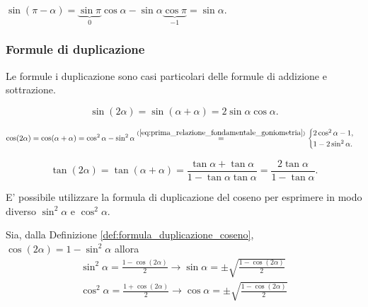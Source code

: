 \begin{example}
    $\sin(\pi-\alpha)=\underbrace{\sin\pi}_{0}\cos\alpha-\sin\alpha\underbrace{\cos\pi}_{-1}=\sin\alpha$.
\end{example}


\subsubsection{Formule di duplicazione}
Le formule i duplicazione sono casi particolari delle formule di addizione e sottrazione.

\begin{definition}
    \begin{equation}\label{eq:formula_duplicazione_seno}
        \sin(2\alpha)=\sin(\alpha+\alpha)=2\sin\alpha\cos\alpha.
    \end{equation}
\end{definition}

\begin{definition}\label{def:formula_duplicazione_coseno}
    \begin{equation}\label{eq:formula_duplciazione_coseno}
        \cos(2\alpha)=\cos(\alpha+\alpha)=\cos^2\alpha-\sin^2\alpha\overset{(\ref{eq:prima_relazione_fondamentale_goniometria})}{=}
        \begin{cases}
            2\cos^2\alpha-1,\\
            1-2\sin^2\alpha.
        \end{cases}
    \end{equation}
\end{definition}

\begin{definition}
    \begin{equation*}
        \tan(2\alpha)=\tan(\alpha+\alpha)=\frac{\tan\alpha+\tan\alpha}{1-\tan\alpha\tan\alpha}=\frac{2\tan\alpha}{1-\tan\alpha}.
    \end{equation*}
\end{definition}

E' possibile utilizzare la formula di duplicazione del coseno per esprimere in modo diverso $\sin^2\alpha$ e $\cos^2\alpha$.
\begin{remark}
    Sia, dalla Definizione \ref{def:formula_duplicazione_coseno}, $\cos(2\alpha)=1-\sin^2\alpha$ allora
    \begin{equation}
        \begin{matrix}
            \sin^2\alpha=\frac{1-\cos(2\alpha)}{2}\rightarrow\sin\alpha=\pm\sqrt{\frac{1-\cos(2\alpha)}{2}}\\
            \cos^2\alpha=\frac{1+\cos(2\alpha)}{2}\rightarrow\cos\alpha=\pm\sqrt{\frac{1-\cos(2\alpha)}{2}}
        \end{matrix}
    \end{equation}
\end{remark}

